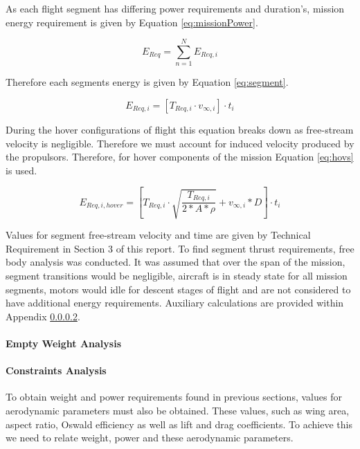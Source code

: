 As each flight segment has differing power requirements and duration's, mission energy requirement is given by Equation \ref{eq:missionPower}. 

\begin{equation}
    E_{Req} = \sum_{n=1}^{N} E_{Req, i}
    \label{eq:missionPower}
\end{equation}

Therefore each segments energy is given by Equation \ref{eq:segment}. 

\begin{equation}
    E_{Req, i} = \left[T_{Req, i} \cdot v_{\infty, i}\right] \cdot t_i
    \label{eq:segment}
\end{equation}

During the hover configurations of flight this equation breaks down as free-stream velocity is negligible. Therefore we must account for induced velocity produced by the propulsors. Therefore, for hover components of the mission Equation \ref{eq:hovs} is used.

\begin{equation}
    E_{Req, i, hover} = \left[T_{Req, i} \cdot \sqrt{\dfrac{T_{Req, i}}{2*A*\rho}} + v_{\infty, i}*D\right] \cdot t_i
    \label{eq:hovs}
\end{equation}



Values for segment free-stream velocity and time are given by Technical Requirement in Section 3 of this report. To find segment thrust requirements, free body analysis was conducted. It was assumed that over the span of the mission, segment transitions would be negligible, aircraft is in steady state for all mission segments, motors would idle for descent stages of flight and are not considered to have additional energy requirements. Auxiliary calculations are provided within Appendix \ref{}.


\paragraph{Empty Weight Analysis}


\paragraph{Constraints Analysis}
To obtain weight and power requirements found in previous sections, values for aerodynamic parameters must also be obtained. These values, such as wing area, aspect ratio, Oswald efficiency as well as lift and drag coefficients. To achieve this we need to relate weight, power and these aerodynamic parameters.\\


